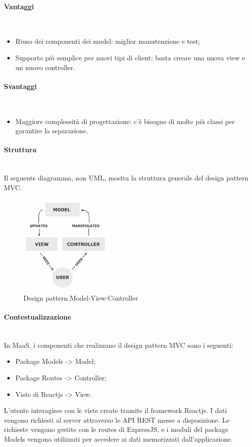 \paragraph{Vantaggi} \mbox{} \\
\begin{itemize}
\item Riuso dei componenti dei model: miglior manutenzione e test;
\item Supporto più semplice per nuovi tipi di client: basta creare una nuova view e un nuovo controller.
\end{itemize}
\paragraph{Svantaggi} \mbox{} \\
\begin{itemize}
\item Maggiore complessità di progettazione: c'è bisogno di molte più classi per garantire la separazione.
\end{itemize}
\paragraph{Struttura} \mbox{} \\
Il seguente diagramma, non UML, mostra la struttura generale del design pattern MVC.
\begin{figure}[H]
\centering
\includegraphics[height=5cm]{res/sections/backend/mvc.png}
\caption{Design pattern Model-View-Controller}
\end{figure}
\paragraph{Contestualizzazione} \mbox{} \\
In MaaS, i componenti che realizzano il design pattern MVC sono i seguenti:
\begin{itemize}
\item Package Models -> Model;
\item Package Routes -> Controller;
\item Viste di Reactjs -> View.
\end{itemize}
L'utente interagisce con le viste create tramite il framework Reactjs. I dati vengono richiesti al server attraverso le API REST messe a disposizione. Le richieste vengono gestite con le routes di ExpressJS, e i moduli del package Models vengono utilizzati per accedere ai dati memorizzati dall'applicazione.